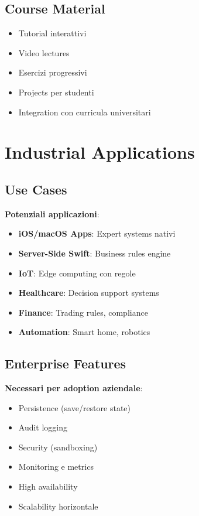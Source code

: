 \subsection{Course Material}

\begin{itemize}
\item Tutorial interattivi
\item Video lectures
\item Esercizi progressivi
\item Projects per studenti
\item Integration con curricula universitari
\end{itemize}

\section{Industrial Applications}

\subsection{Use Cases}

\textbf{Potenziali applicazioni}:

\begin{itemize}
\item \textbf{iOS/macOS Apps}: Expert systems nativi
\item \textbf{Server-Side Swift}: Business rules engine
\item \textbf{IoT}: Edge computing con regole
\item \textbf{Healthcare}: Decision support systems
\item \textbf{Finance}: Trading rules, compliance
\item \textbf{Automation}: Smart home, robotics
\end{itemize}

\subsection{Enterprise Features}

\textbf{Necessari per adoption aziendale}:

\begin{itemize}
\item Persistence (save/restore state)
\item Audit logging
\item Security (sandboxing)
\item Monitoring e metrics
\item High availability
\item Scalability horizontale
\end{itemize}

